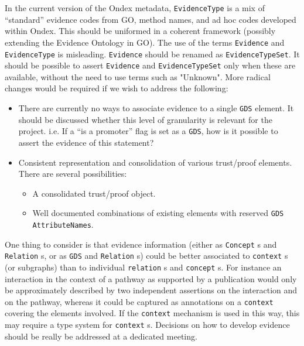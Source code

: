 \documentclass[a4paper,10pt]{article}
\newcommand{\term}[1]{\texttt{#1}\xspace}
\begin{document}
In the current version of the Ondex metadata, \term{EvidenceType} is a mix of ``standard'' evidence codes from GO, method names, and ad hoc codes developed within Ondex. This should be uniformed in a coherent framework (possibly extending the Evidence Ontology in GO).
\vskip 0.3cm
The use of the terms \term{Evidence} and \term{EvidenceType} is misleading. \term{Evidence} should be renamed as \term{EvidenceTypeSet}.
\vskip 0.3cm
It should be possible to assert \term{Evidence} and \term{EvidenceTypeSet} only when these are available, without the need to use terms such as "Unknown".
\vskip 0.3cm
\noindent
More radical changes would be required if we wish to address the following:
\begin{itemize}
\item There are currently no ways to associate evidence to a single \term{GDS} element. It should be discussed whether this level of granularity is relevant for the project. i.e. If a ``is a promoter'' flag is set as a \term{GDS}, how is it possible to assert the evidence of this statement?
\item Consistent representation and consolidation of various trust/proof elements. There are several possibilities:
\begin{itemize}
\item A consolidated trust/proof object.
\item Well documented combinations of existing elements with reserved \term{GDS} \term{AttributeNames}.
\end{itemize}
\end{itemize}
One thing to consider is that evidence information (either as \term{Concept}s and \term{Relation}s, or as \term{GDS} and \term{Relation}s) could be better associated to \term{context}s (or subgraphs) than to individual \term{relation}s and \term{concept}s. For instance an interaction in the context of a pathway as supported by a publication would only be approximately described by two independent assertions on the interaction and on the pathway, whereas it could be captured as annotations on a \term{context} covering the elements involved. If the \term{context} mechanism is used in this way, this may require a type system for \term{context}s.
\vskip 0.3cm
Decisions on how to develop evidence should be really be addressed at a dedicated meeting.
\end{document}
